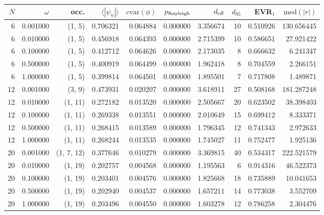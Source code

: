 \begin{tabular}{rrrrrrrrrr}
\toprule
$N$ & $\omega$ & occ. & $\langle|\psi_n|\rangle$ & $\mathrm{cvar}(\phi)$ & $p_{\rm Rayleigh}$ & $d_{\rm eff}$ & $d_{95}$ & EVR$_1$ & $\mathrm{med}(|r|)$ \\
\midrule
6 & 0.001000 & (1, 5) & 0.706321 & 0.064884 & 0.000000 & 3.356674 & 10 & 0.510926 & 130.656445 \\
6 & 0.010000 & (1, 5) & 0.456918 & 0.064393 & 0.000000 & 2.715399 & 10 & 0.586651 & 27.921422 \\
6 & 0.100000 & (1, 5) & 0.412712 & 0.064626 & 0.000000 & 2.173035 & 8 & 0.666632 & 6.241347 \\
6 & 0.500000 & (1, 5) & 0.400919 & 0.064499 & 0.000000 & 1.962418 & 8 & 0.704559 & 2.266151 \\
6 & 1.000000 & (1, 5) & 0.399814 & 0.064501 & 0.000000 & 1.895501 & 7 & 0.717808 & 1.489871 \\
12 & 0.001000 & (3, 9) & 0.473931 & 0.020207 & 0.000000 & 3.618911 & 27 & 0.508168 & 181.287248 \\
12 & 0.010000 & (1, 11) & 0.272182 & 0.013520 & 0.000000 & 2.505667 & 20 & 0.623502 & 38.398403 \\
12 & 0.100000 & (1, 11) & 0.269338 & 0.013551 & 0.000000 & 2.010649 & 15 & 0.699412 & 8.333371 \\
12 & 0.500000 & (1, 11) & 0.268415 & 0.013589 & 0.000000 & 1.796345 & 12 & 0.741343 & 2.972633 \\
12 & 1.000000 & (1, 11) & 0.268244 & 0.013535 & 0.000000 & 1.745027 & 11 & 0.752477 & 1.925136 \\
20 & 0.001000 & (1, 7, 12) & 0.377646 & 0.010279 & 0.000000 & 3.369815 & 40 & 0.534317 & 222.521579 \\
20 & 0.010000 & (1, 19) & 0.202757 & 0.004568 & 0.000000 & 1.195563 & 6 & 0.914316 & 46.522373 \\
20 & 0.100000 & (1, 19) & 0.203401 & 0.004576 & 0.000000 & 1.825668 & 18 & 0.735889 & 10.041653 \\
20 & 0.500000 & (1, 19) & 0.202940 & 0.004537 & 0.000000 & 1.657211 & 14 & 0.773038 & 3.552709 \\
20 & 1.000000 & (1, 19) & 0.203496 & 0.004550 & 0.000000 & 1.603278 & 12 & 0.786258 & 2.304476 \\
\bottomrule
\end{tabular}